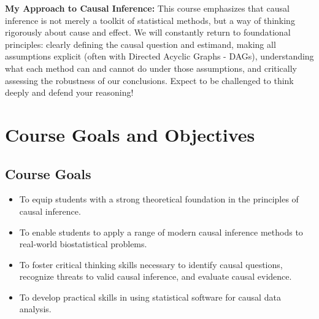 \documentclass[10.5pt]{article}
\begin{document}
\textbf{My Approach to Causal Inference:} This course emphasizes that causal inference is not merely a toolkit of statistical methods, but a way of thinking rigorously about cause and effect. We will constantly return to foundational principles: clearly defining the causal question and estimand, making all assumptions explicit (often with Directed Acyclic Graphs - DAGs), understanding what each method can and cannot do under those assumptions, and critically assessing the robustness of our conclusions. Expect to be challenged to think deeply and defend your reasoning!

\section{Course Goals and Objectives}

\subsection{Course Goals}
\begin{itemize}
    \item To equip students with a strong theoretical foundation in the principles of causal inference.
    \item To enable students to apply a range of modern causal inference methods to real-world biostatistical problems.
    \item To foster critical thinking skills necessary to identify causal questions, recognize threats to valid causal inference, and evaluate causal evidence.
    \item To develop practical skills in using statistical software for causal data analysis.
\end{itemize}
\end{document}
